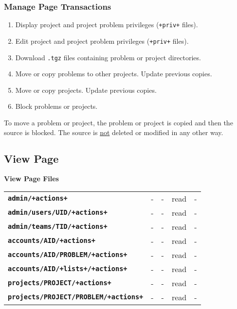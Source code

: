 \documentclass[12pt]{article}
\newcommand{\TT}[1]{{\tt \bfseries #1}}
\begin{document}
\subsubsection{Manage Page Transactions}

\begin{enumerate}
\item Display project and project problem privileges ({\tt +priv+} files).
\item Edit project and project problem privileges ({\tt +priv+} files).
\item Download {\tt .tgz} files containing problem or project directories.
\item Move or copy problems to other projects.  Update previous copies.
\item Move or copy projects.  Update previous copies.
\item Block problems or projects.
\end{enumerate}

To move a problem or project, the problem or project is copied
and then the source is blocked.  The source is \underline{not}
deleted or modified in any other way.

\newpage

\subsection{View Page}

\begin{center}

{\bf View Page Files}

\begin{tabular}{lllll}
\TT{admin/+actions+}    		& -       & -      & read & - \\
\TT{admin/users/UID/+actions+} 		& -       & -      & read & - \\
\TT{admin/teams/TID/+actions+} 		& -       & -      & read & - \\
\TT{accounts/AID/+actions+}    		& -       & -      & read & - \\
\TT{accounts/AID/PROBLEM/+actions+}	& -       & -      & read & - \\
\TT{accounts/AID/+lists+/+actions+}	& -       & -      & read & - \\
\TT{projects/PROJECT/+actions+}    	& -       & -      & read & - \\
\TT{projects/PROJECT/PROBLEM/+actions+} & -       & -      & read & - \\
\end{tabular}


\end{center}
\end{document}
